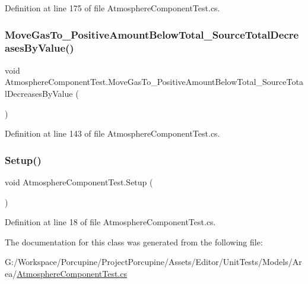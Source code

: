 Definition at line 175 of file Atmosphere\+Component\+Test.\+cs.

\mbox{\label{class_atmosphere_component_test_a005772642830129cf6e1cfc8493d1748}} 
\subsubsection{\texorpdfstring{Move\+Gas\+To\+\_\+\+Positive\+Amount\+Below\+Total\+\_\+\+Source\+Total\+Decreases\+By\+Value()}{MoveGasTo\_PositiveAmountBelowTotal\_SourceTotalDecreasesByValue()}}
{\footnotesize\ttfamily void Atmosphere\+Component\+Test.\+Move\+Gas\+To\+\_\+\+Positive\+Amount\+Below\+Total\+\_\+\+Source\+Total\+Decreases\+By\+Value (\begin{DoxyParamCaption}{ }\end{DoxyParamCaption})}



Definition at line 143 of file Atmosphere\+Component\+Test.\+cs.

\mbox{\label{class_atmosphere_component_test_a745c5dbf88fe22c50ea654d23da0696b}} 
\subsubsection{\texorpdfstring{Setup()}{Setup()}}
{\footnotesize\ttfamily void Atmosphere\+Component\+Test.\+Setup (\begin{DoxyParamCaption}{ }\end{DoxyParamCaption})}



Definition at line 18 of file Atmosphere\+Component\+Test.\+cs.



The documentation for this class was generated from the following file\+:\begin{DoxyCompactItemize}
\item 
G\+:/\+Workspace/\+Porcupine/\+Project\+Porcupine/\+Assets/\+Editor/\+Unit\+Tests/\+Models/\+Area/\hyperlink{_atmosphere_component_test_8cs}{Atmosphere\+Component\+Test.\+cs}\end{DoxyCompactItemize}

